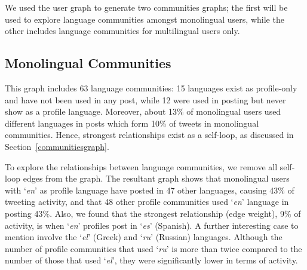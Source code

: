 \documentclass{llncs}
\begin{document}
We used the user graph to generate two communities graphs; the first
will be used to explore language communities amongst monolingual
users, while the other includes language communities for multilingual
users only.


\subsection{Monolingual Communities}

This graph includes 63 language communities: 15 languages exist as
profile-only and have not been used in any post, while 12 were used in
posting but never show as a profile language. Moreover, about 13\% of
monolingual users used different languages in posts which form 10\% of
tweets in monolingual communities. Hence, strongest relationships
exist as a self-loop, as discussed in
Section~\ref{communitiesgraph}.

To explore the relationships between language communities, we remove
all self-loop edges from the graph. The resultant graph shows that
monolingual users with `{\emph{en}}' as profile language have posted
in 47 other languages, causing 43\% of tweeting activity, and that 48
other profile communities used `{\emph{en}}' language in posting
43\%. Also, we found that the strongest relationship (edge weight),
9\% of activity, is when `{\emph{en}}' profiles post in `{\emph{es}}'
(Spanish). A further interesting case to mention involve the `\emph{el}'
(Greek) and `\emph{ru}' (Russian) languages. Although the number of
profile communities that used `\emph{ru}' is more than twice compared to
the number of those that used `\emph{el}', they were significantly lower
in terms of activity.

\end{document}
